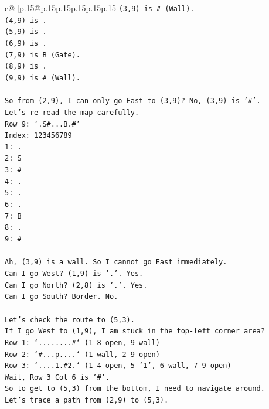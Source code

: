 \documentclass{article}
\begin{document}
{\begin{supertabular}{c@{$\;$}|p{.15\linewidth}@{}p{.15\linewidth}p{.15\linewidth}p{.15\linewidth}p{.15\linewidth}p{.15\linewidth}}
{{{\texttt{(3,9) is \# (Wall).} \\
\texttt{(4,9) is .} \\
\texttt{(5,9) is .} \\
\texttt{(6,9) is .} \\
\texttt{(7,9) is B (Gate).} \\
\texttt{(8,9) is .} \\
\texttt{(9,9) is \# (Wall).} \\
\\ 
\texttt{So from (2,9), I can only go East to (3,9)? No, (3,9) is '\#'.} \\
\texttt{Let's re{-}read the map carefully.} \\
\texttt{Row 9: `.S\#...B.\#`} \\
\texttt{Index: 123456789} \\
\texttt{1: .} \\
\texttt{2: S} \\
\texttt{3: \#} \\
\texttt{4: .} \\
\texttt{5: .} \\
\texttt{6: .} \\
\texttt{7: B} \\
\texttt{8: .} \\
\texttt{9: \#} \\
\\ 
\texttt{Ah, (3,9) is a wall. So I cannot go East immediately.} \\
\texttt{Can I go West? (1,9) is '.'. Yes.} \\
\texttt{Can I go North? (2,8) is '.'. Yes.} \\
\texttt{Can I go South? Border. No.} \\
\\ 
\texttt{Let's check the route to (5,3).} \\
\texttt{If I go West to (1,9), I am stuck in the top{-}left corner area?} \\
\texttt{Row 1: `........\#` (1{-}8 open, 9 wall)} \\
\texttt{Row 2: `\#...p....` (1 wall, 2{-}9 open)} \\
\texttt{Row 3: `....1.\#2.` (1{-}4 open, 5 '1', 6 wall, 7{-}9 open)} \\
\texttt{Wait, Row 3 Col 6 is '\#'.} \\
\texttt{So to get to (5,3) from the bottom, I need to navigate around.} \\
\texttt{Let's trace a path from (2,9) to (5,3).} \\
}}}
\end{supertabular}}
\end{document}
